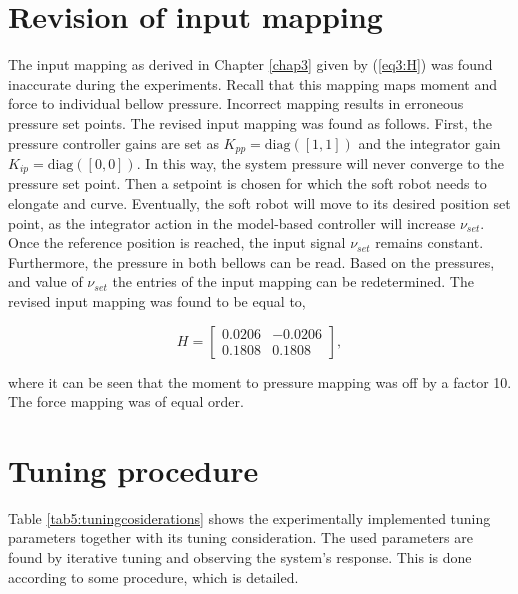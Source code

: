 \section{Revision of input mapping}

The input mapping as derived in Chapter \ref{chap3} given by (\ref{eq3:H}) was found inaccurate during the experiments. Recall that this mapping maps moment and force to individual bellow pressure. Incorrect mapping results in erroneous pressure set points. The revised input mapping was found as follows. First, the pressure controller gains are set as $K_{pp} =\text{diag}([1,1])$ and the integrator gain $K_{ip} = \text{diag}([0,0])$. In this way, the system pressure will never converge to the pressure set point. Then a setpoint is chosen for which the soft robot needs to elongate and curve. Eventually, the soft robot will move to its desired position set point, as the integrator action in the model-based controller will increase $\nu_{set}$. Once the reference position is reached, the input signal $\nu_{set}$ remains constant. Furthermore, the pressure in both bellows can be read. Based on the pressures, and value of $\nu_{set}$ the entries of the input mapping can be redetermined. The revised input mapping was found to be equal to,

\begin{equation}
    H = \begin{bmatrix} 	0.0206 &  -0.0206 \\ 
	0.1808 & 0.1808 \end{bmatrix},
    \label{eq4:revisedH}
\end{equation}

where it can be seen that the moment to pressure mapping was off by a factor 10. The force mapping was of equal order. 

\section{Tuning procedure}


Table \ref{tab5:tuningcosiderations} shows the experimentally implemented tuning parameters together with its tuning consideration. The used parameters are found by iterative tuning and observing the system's response. This is done according to some procedure, which is detailed.

